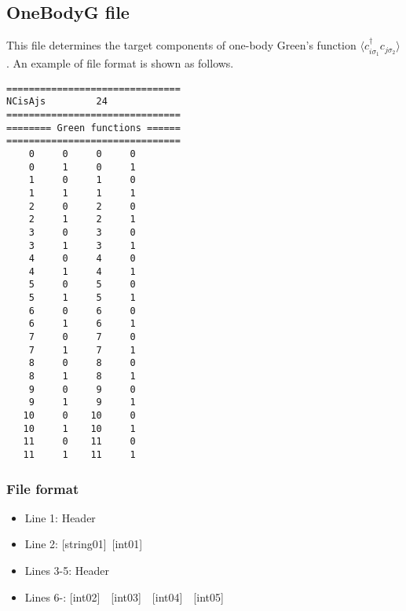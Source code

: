 \newpage
\subsection{OneBodyG file}
\label{Subsec:onebodyg}
This file determines the target components of one-body Green's function $\langle c_{i\sigma_1}^{\dagger}c_{j\sigma_2}\rangle$. An example of file format is shown as follows.

\begin{minipage}{12.5cm}
\begin{screen}
\begin{verbatim}
===============================
NCisAjs         24
===============================
======== Green functions ======
===============================
    0     0     0     0
    0     1     0     1
    1     0     1     0
    1     1     1     1
    2     0     2     0
    2     1     2     1
    3     0     3     0
    3     1     3     1
    4     0     4     0
    4     1     4     1
    5     0     5     0
    5     1     5     1
    6     0     6     0
    6     1     6     1
    7     0     7     0
    7     1     7     1
    8     0     8     0
    8     1     8     1
    9     0     9     0
    9     1     9     1
   10     0    10     0
   10     1    10     1
   11     0    11     0
   11     1    11     1
\end{verbatim}
\end{screen}
\end{minipage}

\subsubsection{File format}
 \begin{itemize}
   \item  Line 1:  Header
   \item  Line 2:   [string01]~[int01]
   \item  Lines 3-5:  Header
   \item  Lines 6-: 
  [int02]~~[int03]~~[int04]~~[int05]
  \end{itemize}

